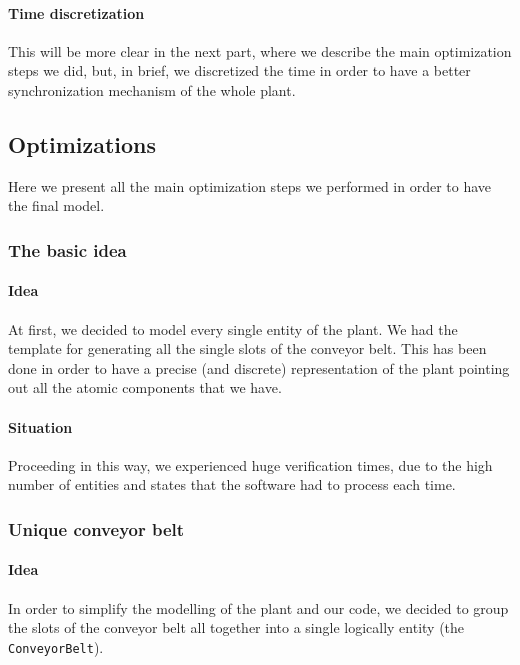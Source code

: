 \documentclass[a4paper,twoside]{article}
\begin{document}
    \paragraph{Time discretization} This will be more clear in the next part, where we describe the main optimization steps we did, but, in brief, we discretized the time in order to have a better synchronization mechanism of the whole plant.

    \subsection{Optimizations}

    Here we present all the main optimization steps we performed in order to have the final model.

    \subsubsection{The basic idea}

    \paragraph{Idea} At first, we decided to model every single entity of the plant. We had the template for generating all the single slots of the conveyor belt. This has been done in order to have a precise (and discrete) representation of the plant pointing out all the atomic components that we have.

    \paragraph{Situation} Proceeding in this way, we experienced huge verification times, due to the high number of entities and states that the software had to process each time.

    \subsubsection{Unique conveyor belt}

    \paragraph{Idea} In order to simplify the modelling of the plant and our code, we decided to group the slots of the conveyor belt all together into a single logically entity (the \texttt{ConveyorBelt}).
\end{document}
